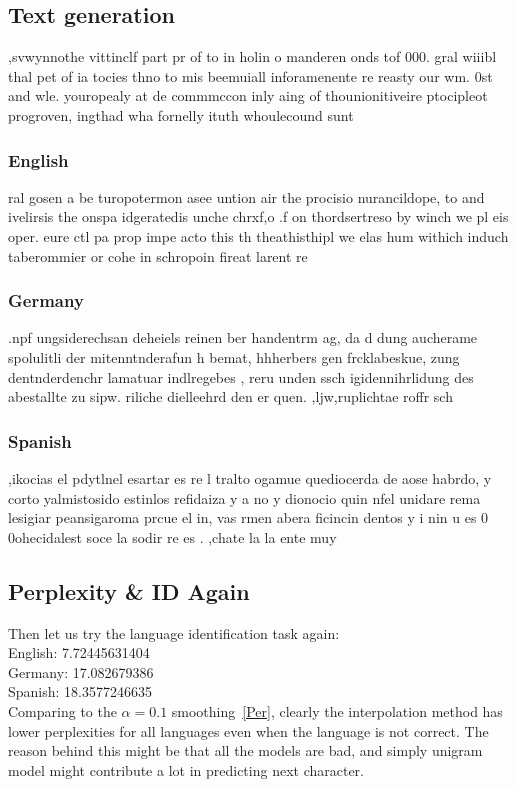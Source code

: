 \documentclass{article}
\begin{document}
\subsection{Text generation}
,svwynnothe vittinclf part pr of to in holin o manderen onds tof 000.
 gral wiiibl thal pet of ia tocies thno to mis beemuiall inforamenente re reasty our wm.
0st and wle.
 youropealy at de commmccon inly aing of thounionitiveire ptocipleot progroven, ingthad wha fornelly ituth whoulecound sunt
\subsubsection{English}
ral gosen a be turopotermon asee untion air the procisio nurancildope, to and ivelirsis the onspa idgeratedis unche  chrxf,o
.f on thordsertreso by winch  we pl eis oper.
 eure ctl pa prop impe acto this th theathisthipl we elas hum withich induch taberommier or cohe in schropoin fireat larent re
\subsubsection{Germany}
.npf ungsiderechsan deheiels reinen ber handentrm ag, da d dung aucherame spolulitli der mitenntnderafun h bemat, hhherbers gen frcklabeskue, zung dentnderdenchr lamatuar indlregebes , reru unden ssch igidennihrlidung des abestallte zu sipw. riliche dielleehrd den er quen.
,ljw,ruplichtae roffr sch
\subsubsection{Spanish}
,ikocias el pdytlnel esartar es re l tralto ogamue quediocerda de aose habrdo, y corto yalmistosido estinlos refidaiza y a no y dionocio quin nfel unidare rema lesigiar peansigaroma prcue el in, vas rmen abera ficincin dentos y i nin u es 0  0ohecidalest soce la sodir re es
.
,chate la la ente muy
\subsection{Perplexity \& ID Again}
Then let us try the language identification task again:\\
English: 7.72445631404\\
Germany: 17.082679386\\
Spanish: 18.3577246635\\

Comparing to the $\alpha=0.1$ smoothing~\ref{Per}, clearly the interpolation method has lower perplexities for all languages even when the language is not correct. The reason behind this might be that all the models are bad, and simply unigram model might contribute a lot in predicting next character.

%

%

\end{document}
